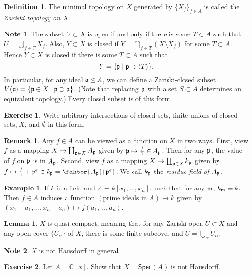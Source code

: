 \documentclass[10pt,letterpaper,cm]{nupset}
\theoremstyle{definition}
\newtheorem*{definition}{Definition}
\newtheorem{exmp}{Example}
\newtheorem{note}{Note}
\newtheorem{remark}{Remark}
\newtheorem{lemma}{Lemma}
\newtheorem{exercise}{Exercise}
\newcommand{\C}{\mathbb C}
\newcommand{\1}{\mathbf{1}}
\newcommand{\p}{\frak{p}}
\newcommand{\0}{\vec 0}
\begin{document}
\begin{definition}
The minimal topology on $X$ generated by $\{X_f\}_{f\in A}$ is called the \textit{Zariski topology on $X$}. 
\end{definition}
\begin{note}
The subset $U\subset X$ is open if and only if there is some $T\subset A$ such that $U = \bigcup_{f\in T} X_f$. Also, $Y \subset X$ is closed if $Y = \bigcap_{f\in T} (X \setminus X_f)$ for some $T\subset A$.  Hence $Y \subset X$ is closed if there is some $T\subset A$ such that $$  Y = \{\p \mid \p \supset \langle T \rangle \}.$$ In particular,  for any ideal $\frak{a} \unlhd A$, we can define a Zariski-closed subset $V(\frak{a}) =  \{ \p \in X \mid  \p \supset \frak{a} \}.$ (Note that replacing $\frak{a}$ with a set $S\subset A$ determines an equivalent topology.) Every closed subset is of this form.
\end{note}

\begin{exercise}
Write arbitrary intersections of closed sets, finite unions of closed sets, $X$, and $\emptyset$ in this form.
\end{exercise}

\begin{remark}
Any $f\in A$ can be viewed as a function on $X$ in two ways. First, view $f$ as a mapping $X \to \coprod_{\p \in X} A_{\p}$ given by $\p \mapsto \frac{f}{1} \in A_{\p}$.  Then for any $\p$, the value of $f$ on $\p$ is in $A_{\p}$. Second, view $f$ as a mapping $X \to \coprod_{\p \in X} k_{\p}$ given by $ f \mapsto \frac{f}{1} + \p^e \in k_{\p} = \faktor{A_{\p}}{\p^e}$. We call $k_{\p}$ the \textit{residue field of $A_{\p}$}. 
\end{remark}

\begin{exmp}
If $k$ is a field and $A = k[x_1, \ldots, x_n]$. such that for any $\frak{m}$, $k_{\frak{m}} = k$. Then  $f\in A$ induces a function $(\text{prime ideals in } A) \to k$ given by $(x_1 -a_1, \ldots, x_n -a_n) \mapsto f(a_1, \ldots, a_n)$.
\end{exmp}

\begin{lemma}
$X$ is quasi-compact, meaning that for any Zariski-open $U \subset X$ and any open cover $\{U_{\alpha}\}$ of $X$, there is some finite subcover and $U = \bigcup_{\alpha} U_{\alpha}$. 
\end{lemma}

\begin{note}
$X$ is not Hausdorff in general. 
\end{note}
\begin{exercise}
Let $A= \C[x]$. Show that $X = \mathsf{Spec}(A)$ is not Hausdorff. 
\end{exercise}
\end{document}
